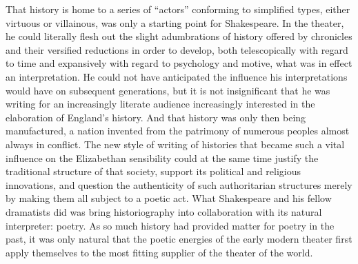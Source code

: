 That history is home to a series of ``actors'' conforming to simplified types, either virtuous or villainous, was only a starting point for Shakespeare. In the theater, he could literally flesh out the slight adumbrations of history offered by chronicles and their versified reductions in order to develop, both telescopically with regard to time and expansively with regard to psychology and motive, what was in effect an interpretation. He could not have anticipated the influence his interpretations would have on subsequent generations, but it is not insignificant that he was writing for an increasingly literate audience increasingly interested in the elaboration of England's history. And that history was only then being manufactured, a nation invented from the patrimony of numerous peoples almost always in conflict. The new style of writing of histories that became such a vital influence on the Elizabethan sensibility could at the same time justify the traditional structure of that society, support its political and religious innovations, and question the authenticity of such authoritarian structures merely by making them all subject to a poetic act. What Shakespeare and his fellow dramatists did was bring historiography into collaboration with its natural interpreter: poetry. As so much history had provided matter for poetry in the past, it was only natural that the poetic energies of the early modern theater first apply themselves to the most fitting supplier of the theater of the world.

